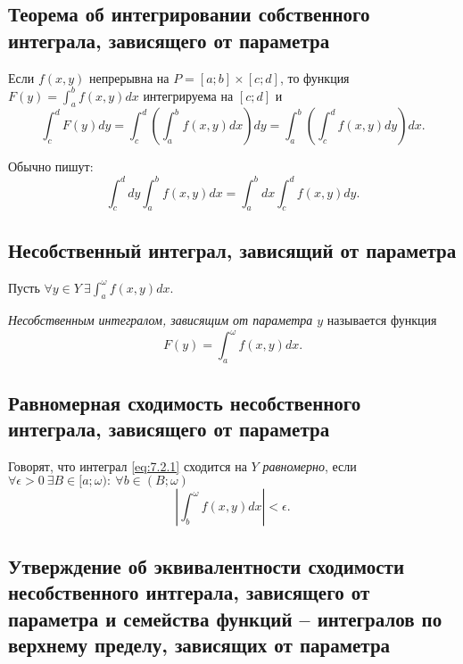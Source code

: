 \subsection{Теорема об интегрировании собственного интеграла, зависящего от параметра}

\begin{theorem}\label{theorem:7.1.3}
    Если $ f(x,y) $ непрерывна на $ P = [a;b] \times [c;d] $, то функция $ F(y) = \int_{a}^{b}f(x,y)dx $ интегрируема на $ [c;d] $ и
    \[
        \int_{c}^{d}F(y)dy = \int_{c}^{d}\left(\int_{a}^{b}f(x,y)dx\right)dy = \int_{a}^{b}\left(\int_{c}^{d}f(x,y)dy\right)dx.
    \]

    Обычно пишут:
    \[
        \int_{c}^{d}dy \int_{a}^{b}f(x,y)dx = \int_{a}^{b}dx \int_{c}^{d}f(x,y)dy.
    \]
\end{theorem}

\newpage

\subsection{Несобственный интеграл, зависящий от параметра}

\begin{definition}
    Пусть $ \forall y \in Y \ \exists \int_{a}^{\omega}f(x,y)dx $.

    \emph{Несобственным интегралом, зависящим от параметра $ y $} называется функция
    \begin{equation}\label{eq:7.2.1}
        F(y) = \int_{a}^{\omega}f(x,y)dx.
    \end{equation}
\end{definition}

\subsection{Равномерная сходимость несобственного интеграла, зависящего от параметра}

\begin{definition}
    Говорят, что интеграл \ref{eq:7.2.1} сходится на $ Y $ \emph{равномерно}, если $ \forall \epsilon > 0 \ \exists B \in [a;\omega): \ \forall b \in (B;\omega) $
    \[
        \left|\int_{b}^{\omega}f(x,y)dx\right| < \epsilon.
    \]
\end{definition}

\subsection{Утверждение об эквивалентности сходимости несобственного интгерала, зависящего от параметра и семейства функций – интегралов по верхнему пределу, зависящих от параметра}

